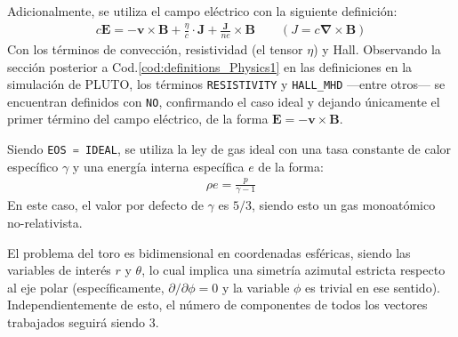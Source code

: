 \documentclass[11pt, letterpaper]{article}
\begin{document}
Adicionalmente, se utiliza el campo eléctrico con la siguiente definición:
\begin{align}\label{eq:E_general}
    c\mathbf{E} = -\mathbf{v} \times \mathbf{B} + \frac{\eta}{c} \cdot \mathbf{J} + \frac{\mathbf{J}}{ne} \times \mathbf{B} \quad \quad (J = c\mathbf{\nabla \times B})
\end{align}
Con los términos de convección, resistividad (el tensor $\eta$) y Hall. Observando la sección posterior a Cod.\ref{cod:definitions_Physics1} en las definiciones en la simulación de PLUTO, los términos \lstinline[language=C]{RESISTIVITY} y \lstinline[language=C]{HALL_MHD} ---entre otros--- se encuentran definidos con \lstinline[language=C]{NO}, confirmando el caso ideal y dejando únicamente el primer término del campo eléctrico, de la forma $\mathbf{E = -v \times B}$.

\medskip

Siendo \lstinline[language=C]{EOS = IDEAL}, se utiliza la ley de gas ideal con una tasa constante de calor específico $\gamma$ y una energía interna específica $e$ de la forma:
\begin{align*}
    \rho e = \frac{p}{\gamma - 1}
\end{align*}
En este caso, el valor por defecto de $\gamma$ es $5/3$, siendo esto un gas monoatómico no-relativista.\cite{plutomanual}

\medskip

El problema del toro es bidimensional en coordenadas esféricas, siendo las variables de interés $r$ y $\theta$, lo cual implica una simetría azimutal estricta respecto al eje polar (específicamente, $\partial / \partial \phi = 0$ y la variable $\phi$ es trivial en ese sentido). Independientemente de esto, el número de componentes de todos los vectores trabajados seguirá siendo 3.

\medskip
\end{document}
